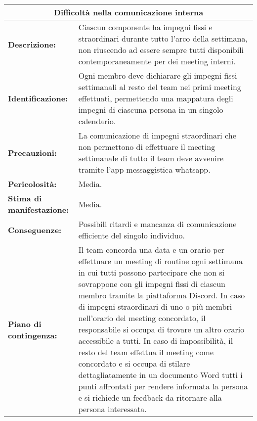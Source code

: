 \begin{tabular}{ |p{4cm}|p{10cm}|}
\hline
\multicolumn{2}{|c|}{\textbf{Difficoltà nella comunicazione interna}} \\
\hline
\textbf{Descrizione:}& Ciascun componente ha impegni fissi e straordinari durante tutto l'arco della settimana, non riuscendo ad essere sempre tutti disponibili contemporaneamente per dei meeting interni.\\
\hline
\textbf{Identificazione:}& Ogni membro deve dichiarare gli impegni fissi settimanali al resto del team nei primi meeting effettuati, permettendo una mappatura degli impegni di ciascuna persona in un singolo calendario.\\
\hline
\textbf{Precauzioni:}& La comunicazione di impegni straordinari che non permettono di effettuare il meeting settimanale di tutto il team deve avvenire tramite l'app messaggistica whatsapp.\\
\hline
\textbf{Pericolosità:}& Media.\\
\hline
\textbf{Stima di manifestazione:}& Media.\\
\hline
\textbf{Conseguenze:}& Possibili ritardi e mancanza di comunicazione efficiente del singolo individuo.\\
\hline
\textbf{Piano di contingenza:}& Il team concorda una data e un orario per effettuare un meeting di routine ogni settimana in cui tutti possono partecipare che non si sovrappone con gli impegni fissi di ciascun membro tramite la piattaforma Discord. In caso di impegni straordinari di uno o più membri nell'orario del meeting concordato, il responsabile si occupa di trovare un altro orario accessibile a tutti. In caso di impossibilità, il resto del team effettua il meeting come concordato e si occupa di stilare dettagliatamente in un documento Word tutti i punti affrontati per rendere informata la persona e si richiede un feedback da ritornare alla persona interessata.\\
\hline
\end{tabular}

\vspace{20pt}

